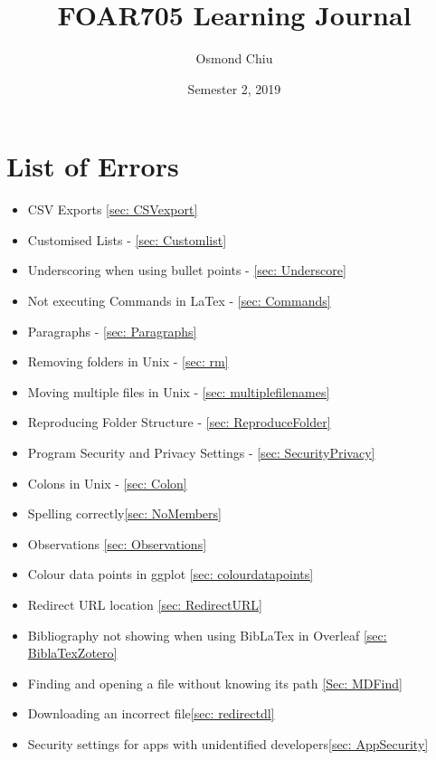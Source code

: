 \documentclass{article}
\title{FOAR705 Learning Journal}
\author{Osmond Chiu}
\date{Semester 2, 2019}
\begin{document}
\maketitle
\tableofcontents
 
\newpage



\section{List of Errors}\par
\begin{itemize}
    \item CSV Exports \ref{sec: CSVexport}
    \item Customised Lists - \ref{sec: Customlist}
    \item Underscoring when using bullet points - \ref{sec: Underscore}
    \item Not executing Commands in LaTex - \ref{sec: Commands}
    \item Paragraphs - \ref{sec: Paragraphs}\par
    \item Removing folders in Unix - \ref{sec: rm}\par
    \item Moving multiple files in Unix - \ref{sec: multiplefilenames}\par
    \item Reproducing Folder Structure - \ref{sec: ReproduceFolder}
    \item Program Security and Privacy Settings - \ref{sec: SecurityPrivacy}
    \item Colons in Unix - \ref{sec: Colon}
    \item Spelling correctly\ref{sec: NoMembers}
    \item Observations \ref{sec: Observations}
    \item Colour data points in ggplot \ref{sec: colourdatapoints}
    \item Redirect URL location \ref{sec: RedirectURL}
    \item Bibliography not showing when using BibLaTex in Overleaf \ref{sec: BiblaTexZotero}
    \item Finding and opening a file without knowing its path \ref{Sec: MDFind}
    \item Downloading an incorrect file\ref{sec: redirectdl}
    \item Security settings for apps with unidentified developers\ref{sec: AppSecurity}
\end{itemize}
\end{document}
